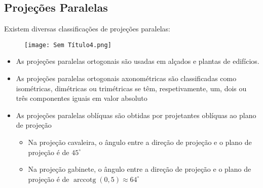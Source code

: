\documentclass[10pt,a4paper]{report}
\DeclareMathOperator{\arccotg}{arccotg}
\begin{document}
\subsection{Projeções Paralelas}
Existem diversas classificações de projeções paralelas:
\begin{figure}[H]
\centering
\texttt{[image: Sem Título4.png]}
\end{figure}
\begin{itemize}
\item As projeções paralelas ortogonais são usadas em alçados e plantas de edifícios.
\item As projeções paralelas ortogonais axonométricas são classificadas como isométricas, dimétricas ou trimétricas se têm, respetivamente, um, dois ou três componentes iguais em valor absoluto
\item As projeções paralelas oblíquas são obtidas por projetantes oblíquas ao plano de projeção
\begin{itemize}
\item Na projeção cavaleira, o ângulo entre a direção de projeção e o plano de projeção é de $45^{\circ}$
\item Na projeção gabinete, o ângulo entre a direção de projeção e o plano de projeção é de $\arccotg(0,5) \approx 64^{\circ}$
\end{itemize}
\end{itemize}
\end{document}
